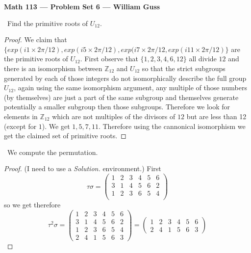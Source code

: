 \documentclass[11pt]{amsart}
\begin{document}
\begin{center}{\bf Math 113 --- Problem Set 6 --- William Guss} \end{center}


\bigskip


\medskip {}\ Find the primitive roots of $U_{12}.$
\begin{proof}
	We claim that $\{exp(i1\times 2\pi/12), exp(i5\times 2\pi/12),exp(i7\times 2\pi/12, exp(i11\times 2\pi/12)\}$ are the primitive roots of $U_{12}.$ First observe that $\{1,2,3,4,6,12\}$ all divide $12$ and there is an isomorphism between $\mathbb{Z}_{12}$ and $U_{12}$ so that the strict subgroups generated by each of those integers do not isomorphically describe the full group $U_{12}$, again using the same isomorphism argument, any multiple of those numbers (by themselves) are just a part of the same subgroup and themselves generate potentially a smaller subgroup then those subgroups. Therefore we look for elements in $\mathbb{Z}_{12}$ which are not multiples of the divisors of $12$ but are less than 12 (except for $1$). We get $1,5,7,11$. Therefore using the cannonical isomorphism we get the claimed set of primitive roots. 
\end{proof}
\medskip {}\ We compute the permutation. 
\begin{proof}
	(I need to use a \emph{Solution.} environment.)  First 
	\begin{equation*}
		\tau \sigma = \begin{pmatrix}
			1 & 2 & 3 & 4 & 5 & 6 \\
			3 & 1 & 4 & 5 & 6 & 2 \\
			1 & 2 & 3 & 6 & 5 & 4 \\
		\end{pmatrix}
	\end{equation*}
	so we get therefore
	\begin{equation*}
		\tau^2 \sigma = 
		\begin{pmatrix}
			1 & 2 & 3 & 4 & 5 & 6 \\
			3 & 1 & 4 & 5 & 6 & 2 \\
			1 & 2 & 3 & 6 & 5 & 4 \\
			2 & 4 & 1 & 5 & 6 & 3
		\end{pmatrix} =
		\begin{pmatrix}
			1 & 2 & 3 & 4 & 5 & 6 \\
			2 & 4 & 1 & 5 & 6 & 3
		\end{pmatrix}
	\end{equation*}

\end{proof}
\end{document}
